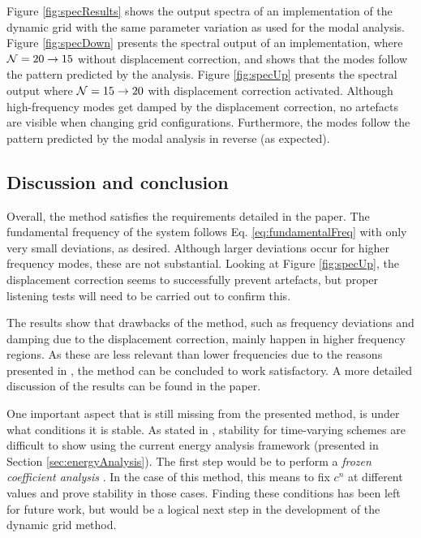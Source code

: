 Figure \ref{fig:specResults} shows the output spectra of an implementation of the dynamic grid with the same parameter variation as used for the modal analysis. Figure \ref{fig:specDown} presents the spectral output of an implementation, where $\mathcal{N} = 20 \rightarrow 15$ without displacement correction, and shows that the modes follow the pattern predicted by the analysis. Figure \ref{fig:specUp} presents the spectral output where $\mathcal{N} = 15 \rightarrow 20$ with displacement correction activated. Although high-frequency modes get damped by the displacement correction, no artefacts are visible when changing grid configurations. Furthermore, the modes follow the pattern predicted by the modal analysis in reverse (as expected).

\subsection{Discussion and conclusion}\label{sec:conclusion}

Overall, the method satisfies the requirements detailed in the paper. The fundamental frequency of the system follows Eq. \eqref{eq:fundamentalFreq} with only very small deviations, as desired. Although larger deviations occur for higher frequency modes, these are not substantial. Looking at Figure \ref{fig:specUp}, the displacement correction seems to successfully prevent artefacts, but proper listening tests will need to be carried out to confirm this.

The results show that drawbacks of the method, such as frequency deviations and damping due to the displacement correction, mainly happen in higher frequency regions. As these are less relevant than lower frequencies due to the reasons presented in \citeP[G], the method can be concluded to work satisfactory. A more detailed discussion of the results can be found in the paper.  

One important aspect that is still missing from the presented method, is under what conditions it is stable. As stated in \cite{theBible}, stability for time-varying schemes are difficult to show using the current energy analysis framework (presented in Section \ref{sec:energyAnalysis}). The first step would be to perform a \textit{frozen coefficient analysis} \cite{Strikwerda1989}. In the case of this method, this means to fix $c^n$ at different values and prove stability in those cases. Finding these conditions has been left for future work, but would be a logical next step in the development of the dynamic grid method.


